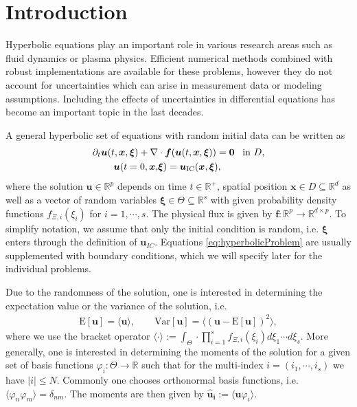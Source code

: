 \section{Introduction}
Hyperbolic equations play an important role in various research areas such as fluid dynamics or plasma physics. Efficient numerical methods combined with robust implementations are available for these problems, however they do not account for uncertainties which can arise in measurement data or modeling assumptions. Including the effects of uncertainties in differential equations has become an important topic in the last decades. %

A general hyperbolic set of equations with random initial data can be written as
\begin{subequations}\label{eq:hyperbolicProblem}
\begin{align}
\partial_t \bm{u}(t,\bm{x},\bm{\xi}) + \nabla&\cdot\bm{f}(\bm{u}(t,\bm{x},\bm{\xi})) = \bm{0} \enskip \text{ in } D, \\ \label{eq:ic}
\bm{u}(t=0,\bm{x},&\bm{\xi}) = \bm{u}_{\text{IC}}(\bm{x},\bm{\xi}),
\end{align}
\end{subequations}
where the solution $\bm u\in\mathbb{R}^p$ depends on time $t\in\mathbb{R}^+$, spatial position $\bm{x}\in D\subseteq \mathbb{R}^d$ as well as a vector of random variables $\bm{\xi}\in\Theta\subseteq\mathbb{R}^s$ with given probability density functions $f_{\Xi,i}(\xi_i)$ for $i = 1,\cdots,s$. The physical flux is given by $\bm{f}:\mathbb{R}^p\to\mathbb{R}^{d\times p}$. To simplify notation, we assume that only the initial condition is random, i.e. $\bm{\xi}$ enters through the definition of $\bm{u}_{IC}$. Equations \eqref{eq:hyperbolicProblem} are usually supplemented with boundary conditions, which we will specify later for the individual problems.

Due to the randomness of the solution, one is interested in determining the expectation value or the variance of the solution, i.e.
\begin{align*}
\text{E}[\bm{u}] = \langle \bm{u} \rangle,\qquad \text{Var}[\bm{u}] = \langle \left( \bm{u}-\text{E}[\bm{u}]\right)^2\rangle,
\end{align*}
where we use the bracket operator $\langle \cdot \rangle := \int_{\Theta} \cdot \prod_{i=1}^s f_{\Xi,i}(\xi_i)d\xi_1 \cdots d\xi_s$. More generally, one is interested in determining the moments of the solution for a given set of basis functions $\varphi_{i}:\Theta\to\mathbb{R}$ such that for the multi-index $i = (i_1,\cdots,i_s)$ we have $|i| \leq N$. Commonly one chooses orthonormal basis functions, i.e. $\langle \varphi_n \varphi_m \rangle = \delta_{nm}$.  The moments are then given by $\bm{\hat u_i} := \langle \bm{u}\varphi_i \rangle$.\\

